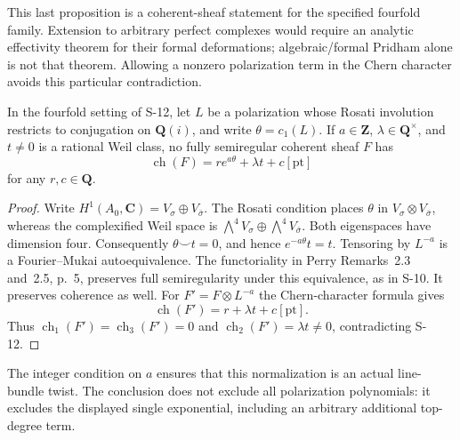 This last proposition is a coherent-sheaf statement for the
specified fourfold family. Extension to arbitrary perfect complexes
would require an analytic effectivity theorem for their formal
deformations; algebraic/formal Pridham alone is not that theorem.
Allowing a nonzero polarization term in the Chern character
avoids this particular contradiction.

\begin{proposition}
\label{prop:semireg-single-exponential-no-go}
In the fourfold setting of S-12, let $L$ be a polarization whose
Rosati involution restricts to conjugation on $\mathbf Q(i)$, and
write $\theta=c_1(L)$. If $a\in\mathbf Z$, $\lambda\in\mathbf Q^\times$,
and $t\ne0$ is a rational Weil class, no fully semiregular coherent
sheaf $F$ has
\[
 \operatorname{ch}(F)=r e^{a\theta}+\lambda t+c[\mathrm{pt}]
\]
for any $r,c\in\mathbf Q$.
\end{proposition}
\begin{proof}
Write $H^1(A_0,\mathbf C)=V_\sigma\oplus V_{\bar\sigma}$.
The Rosati condition places $\theta$ in
$V_\sigma\otimes V_{\bar\sigma}$, whereas the complexified Weil
space is
$\bigwedge^4V_\sigma\oplus\bigwedge^4V_{\bar\sigma}$.
Both eigenspaces have dimension four. Consequently
$\theta\smile t=0$, and hence $e^{-a\theta}t=t$.
Tensoring by $L^{-a}$ is a Fourier--Mukai autoequivalence.
The functoriality in Perry Remarks~2.3 and~2.5, p.~5, preserves
full semiregularity under this equivalence, as in S-10.
It preserves coherence as well.
For $F'=F\otimes L^{-a}$ the Chern-character formula gives
\[
 \operatorname{ch}(F')=r+\lambda t+c[\mathrm{pt}].
\]
Thus $\operatorname{ch}_1(F')=\operatorname{ch}_3(F')=0$ and
$\operatorname{ch}_2(F')=\lambda t\ne0$, contradicting S-12.
\end{proof}

The integer condition on $a$ ensures that this normalization is an
actual line-bundle twist. The conclusion does not exclude all
polarization polynomials: it excludes the displayed single
exponential, including an arbitrary additional top-degree term.

